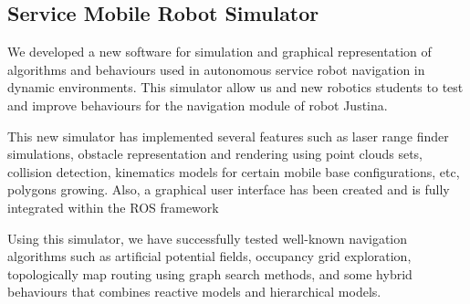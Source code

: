 \documentclass{llncs}
\begin{document}

\subsection{Service Mobile Robot Simulator}\label{subsec:Simulator}

We developed a new software for simulation and graphical representation of algorithms and behaviours used   in autonomous service robot navigation in dynamic environments. This simulator allow us and new robotics students to test and improve behaviours for the navigation module of robot Justina.

This new simulator has implemented several features such as laser range finder simulations, obstacle representation and rendering using point clouds sets, collision detection, kinematics models for certain mobile base configurations, etc, polygons growing. Also, a graphical user interface has been created and is fully integrated within the ROS framework

Using this simulator, we have successfully tested well-known navigation algorithms such as artificial potential fields, occupancy grid exploration, topologically map routing using graph search methods, and some hybrid behaviours that combines reactive models and hierarchical models.
\end{document}
